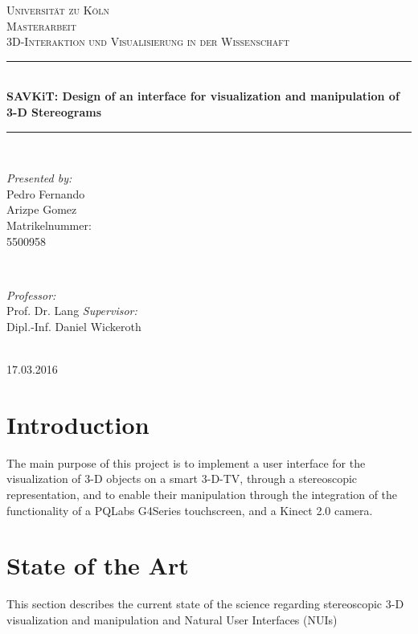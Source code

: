 \documentclass[12pt]{extarticle}
\date{}
\begin{document}
\begin{titlepage}
\newcommand{\HRule}{\rule{\linewidth}{0.5mm}}
\center
\textsc{\LARGE Universität zu Köln}\\[1.5cm]
\textsc{\Large Masterarbeit}\\[0.5cm] 
\textsc{\large 3D-Interaktion und Visualisierung in der Wissenschaft}\\[0.5cm] 
\HRule \\[0.4cm]
{ \Large \bfseries 
SAVKiT: Design of an interface for visualization and manipulation of 3-D Stereograms}\\[0.4cm]
\HRule \\[1.5cm]
\begin{minipage}{0.4\textwidth}
\begin{flushleft} \large
\emph{Presented by:}\\
Pedro Fernando \\
Arizpe Gomez\\ 
		Matrikelnummer:\\5500958 
\end{flushleft}
\end{minipage}
~
\begin{minipage}{0.4\textwidth}
\begin{flushright}
\large\emph{Professor:} \\
Prof. Dr. Lang
\large\emph{Supervisor:} \\
Dipl.-Inf. Daniel Wickeroth
\end{flushright}
\end{minipage}\\[4cm]
{\large 17.03.2016}\\[3cm] 
\vfill 
\end{titlepage}
\tableofcontents
\pagebreak{}
\section{Introduction} \label{sec:Int}
The main purpose of this project is to implement a user interface for the visualization of 3-D objects on a smart 3-D-TV, through a stereoscopic representation, and to enable their manipulation through the integration of the functionality of a PQLabs G4Series touchscreen, and a Kinect 2.0 camera.

\section{State of the Art}\label{sec:Soa}
This section describes the current state of the science regarding stereoscopic 3-D visualization and manipulation and Natural User Interfaces (NUIs)
\end{document}
